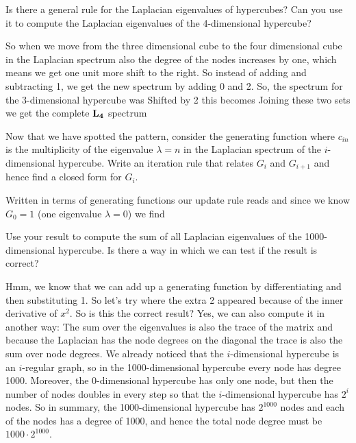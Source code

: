 \subquestion
Is there a general rule for the Laplacian eigenvalues of hypercubes? Can you use it to compute the Laplacian eigenvalues of the 4-dimensional hypercube?

\solution
So when we move from the three dimensional cube to the four dimensional cube in the Laplacian spectrum also the degree of the nodes increases by one, which means we get one unit more shift to the right. So instead of adding and subtracting 1, we get the new spectrum by adding 0 and 2. So, the spectrum for the 3-dimensional hypercube was
Shifted by 2 this becomes 
Joining these two sets we get the complete ${\bf L_4}$ spectrum

\subquestion
Now that we have spotted the pattern, consider the generating function
where $c_{in}$ is the multiplicity of the eigenvalue $\lambda=n$ in the Laplacian spectrum of the $i$-dimensional hypercube. Write an iteration rule that relates $G_i$ and $G_{i+1}$ and hence find a closed form for $G_i$.

\solution
Written in terms of generating functions our update rule reads 
and since we know $G_0=1$ (one eigenvalue $\lambda=0$) we find

\subquestion
Use your result to compute the sum of all Laplacian eigenvalues of the 1000-dimensional hypercube. Is there a way in which we can test if the result is correct?

\solution 
Hmm, we know that we can add up a generating function by differentiating and then substituting 1. So let's try 
where the extra 2 appeared because of the inner derivative of $x^2$. So is this the correct result? Yes, we can also compute it in another way: The sum over the eigenvalues is also the trace of the matrix and because the Laplacian has the node degrees on the diagonal the trace is also the sum over node degrees. We already noticed that the $i$-dimensional hypercube is an $i$-regular graph, so in the 1000-dimensional hypercube every node has degree 1000. Moreover, the 0-dimensional hypercube has only one node, but then the number of nodes doubles in every step so that the $i$-dimensional hypercube has $2^{i}$ nodes. So in summary, the 1000-dimensional hypercube has $2^{1000}$ nodes and each of the nodes has a degree of 1000, and hence the total node degree must be $1000\cdot 2^{1000}$.   
